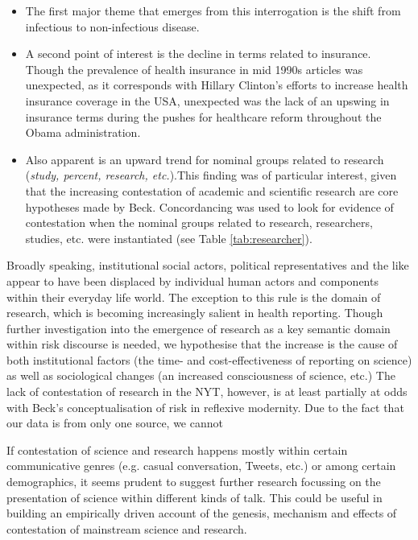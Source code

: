 \begin{itemize}
\item The first major theme that emerges from this interrogation is the shift from infectious to non-infectious disease.
\item A second point of interest is the decline in terms related to insurance. Though the prevalence of health insurance in mid 1990s articles was unexpected, as it corresponds with Hillary Clinton's efforts to increase health insurance coverage in the USA, unexpected was the lack of an upswing in insurance terms during the pushes for healthcare reform throughout the Obama administration.
\item Also apparent is an upward trend for nominal groups related to research (\emph{study, percent, research, etc.}).This finding was of particular interest, given that the increasing contestation of academic and scientific research are core hypotheses made by Beck. Concordancing was used to look for evidence of contestation when the nominal groups related to research, researchers, studies, etc. were instantiated (see Table \ref{tab:researcher}).
\end{itemize}
%
Broadly speaking, institutional social actors, political representatives and the like appear to have been displaced by individual human actors and components within their everyday life world. The exception to this rule is the domain of research, which is becoming increasingly salient in health reporting. Though further investigation into the emergence of research as a key semantic domain within risk discourse is needed, we hypothesise that the increase is the cause of both institutional factors (the time- and cost-effectiveness of reporting on science) as well as sociological changes (an increased consciousness of science, etc.) The lack of contestation of research in the NYT, however, is at least partially at odds with Beck's conceptualisation of risk in reflexive modernity. Due to the fact that our data is from only one source, we cannot 

If contestation of science and research happens mostly within certain communicative genres (e.g. casual conversation, Tweets, etc.) or among certain demographics, it seems prudent to suggest further research focussing on the presentation of science within different kinds of talk. This could be useful in building an empirically driven account of the genesis, mechanism and effects of contestation of mainstream science and research.

